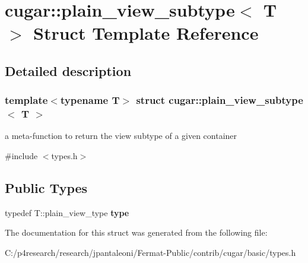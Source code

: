 \hypertarget{structcugar_1_1plain__view__subtype}{}\section{cugar\+:\+:plain\+\_\+view\+\_\+subtype$<$ T $>$ Struct Template Reference}
\label{structcugar_1_1plain__view__subtype}


\subsection{Detailed description}
\subsubsection*{template$<$typename T$>$\newline
struct cugar\+::plain\+\_\+view\+\_\+subtype$<$ T $>$}

a meta-\/function to return the view subtype of a given container 

{\ttfamily \#include $<$types.\+h$>$}

\subsection*{Public Types}
\begin{DoxyCompactItemize}
\item 
\mbox{\label{structcugar_1_1plain__view__subtype_a934023f4d75815405aec286e2ed50a03}} 
typedef T\+::plain\+\_\+view\+\_\+type {\bfseries type}
\end{DoxyCompactItemize}


The documentation for this struct was generated from the following file\+:\begin{DoxyCompactItemize}
\item 
C\+:/p4research/research/jpantaleoni/\+Fermat-\/\+Public/contrib/cugar/basic/types.\+h\end{DoxyCompactItemize}
